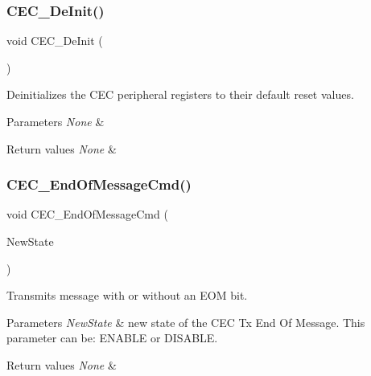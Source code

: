 \subsubsection{\texorpdfstring{CEC\_DeInit()}{CEC\_DeInit()}}
{\footnotesize\ttfamily void C\+E\+C\+\_\+\+De\+Init (\begin{DoxyParamCaption}\item[{void}]{ }\end{DoxyParamCaption})}



Deinitializes the C\+EC peripheral registers to their default reset values. 


\begin{DoxyParams}{Parameters}
{\em None} & \\
\hline
\end{DoxyParams}

\begin{DoxyRetVals}{Return values}
{\em None} & \\
\hline
\end{DoxyRetVals}
\mbox{\label{group___c_e_c___exported___functions_ga1e2cf6e3a1ac891f2814f9d3f4043574}} 
\subsubsection{\texorpdfstring{CEC\_EndOfMessageCmd()}{CEC\_EndOfMessageCmd()}}
{\footnotesize\ttfamily void C\+E\+C\+\_\+\+End\+Of\+Message\+Cmd (\begin{DoxyParamCaption}\item[{\mbox{\hyperlink{group___exported__types_gac9a7e9a35d2513ec15c3b537aaa4fba1}{Functional\+State}}}]{New\+State }\end{DoxyParamCaption})}



Transmits message with or without an E\+OM bit. 


\begin{DoxyParams}{Parameters}
{\em New\+State} & new state of the C\+EC Tx End Of Message. This parameter can be\+: E\+N\+A\+B\+LE or D\+I\+S\+A\+B\+LE. \\
\hline
\end{DoxyParams}

\begin{DoxyRetVals}{Return values}
{\em None} & \\
\hline
\end{DoxyRetVals}
\mbox{\label{group___c_e_c___exported___functions_gaf920706cb350182bf0728c66868053ca}} 
